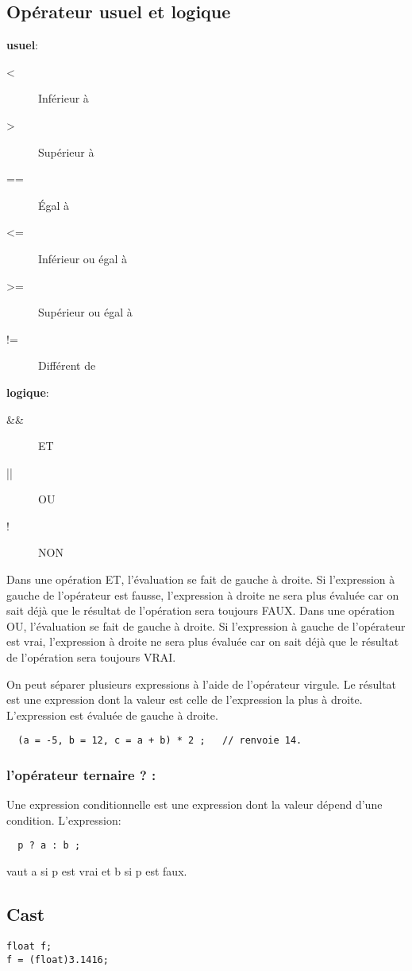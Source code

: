 \documentclass[a4paper]{article}
\begin{document}
\subsection{Opérateur usuel et logique}
\textbf{usuel}: %
\begin{description}
  \item [<] 	Inférieur à
  \item [>] 	Supérieur à
  \item [==] 	Égal à
  \item [<=] 	Inférieur ou égal à
  \item [>=] 	Supérieur ou égal à
  \item [!=] 	Différent de
\end{description}
\textbf{logique}:
\begin{description}
  \item [\&\&] ET
  \item [||] OU
  \item [!] NON
\end{description}
Dans une opération ET, l'évaluation se fait de gauche à droite. Si l'expression à gauche de l'opérateur est fausse, l'expression à droite ne sera plus évaluée car on sait déjà que le résultat de l'opération sera toujours FAUX.\newline
Dans une opération OU, l'évaluation se fait de gauche à droite. Si l'expression à gauche de l'opérateur est vrai, l'expression à droite ne sera plus évaluée car on sait déjà que le résultat de l'opération sera toujours VRAI.


On peut séparer plusieurs expressions à l'aide de l'opérateur virgule. Le résultat est une expression dont la valeur est celle de l'expression la plus à droite. L'expression est évaluée de gauche à droite.
\begin{lstlisting}
  (a = -5, b = 12, c = a + b) * 2 ;   // renvoie 14.
\end{lstlisting}
\subsubsection{l'opérateur ternaire \guillemotleft{}? : \guillemotright{}}
Une expression conditionnelle est une expression dont la valeur dépend d'une condition. L'expression:
\begin{lstlisting}
  p ? a : b ;
\end{lstlisting}
vaut a si p est vrai et b si p est faux.
\subsection{Cast}
\begin{lstlisting}
float f;
f = (float)3.1416;
\end{lstlisting}
\end{document}
